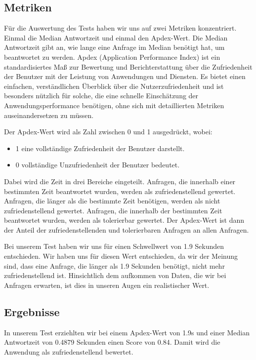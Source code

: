 \documentclass{qualitätssicherungsheft}
\begin{document}
\subsection{Metriken}
Für die Auswertung des Tests haben wir uns auf zwei Metriken konzentriert.
Einmal die Median Antwortzeit und einmal den Apdex-Wert.
Die Median Antwortzeit gibt an, wie lange eine Anfrage im Median benötigt hat, um beantwortet zu werden.
Apdex (Application Performance Index) ist ein standardisiertes Maß zur Bewertung und Berichterstattung über die Zufriedenheit der Benutzer mit der Leistung von Anwendungen und Diensten. Es bietet einen einfachen, verständlichen Überblick über die Nutzerzufriedenheit und ist besonders nützlich für solche, die eine schnelle Einschätzung der Anwendungsperformance benötigen, ohne sich mit detaillierten Metriken auseinandersetzen zu müssen.

Der Apdex-Wert wird als Zahl zwischen 0 und 1 ausgedrückt, wobei:
\begin{itemize}
    \item 1 eine vollständige Zufriedenheit der Benutzer darstellt.
    \item 0 vollständige Unzufriedenheit der Benutzer bedeutet.
\end{itemize}

Dabei wird die Zeit in drei Bereiche eingeteilt.
Anfragen, die innerhalb einer bestimmten Zeit beantwortet wurden, werden als zufriedenstellend gewertet.
Anfragen, die länger als die bestimmte Zeit benötigen, werden als nicht zufriedenstellend gewertet.
Anfragen, die innerhalb der bestimmten Zeit beantwortet wurden, werden als tolerierbar gewertet.
Der Apdex-Wert ist dann der Anteil der zufriedenstellenden und tolerierbaren Anfragen an allen Anfragen.

Bei unserem Test haben wir uns für einen Schwellwert von 1.9 Sekunden entschieden. Wir haben uns für diesen Wert entschieden, da wir der Meinung sind, dass eine Anfrage, die länger als 1.9 Sekunden benötigt, nicht mehr zufriedenstellend ist. Hinsichtlich dem aufkommen von Daten, die wir bei Anfragen erwarten, ist dies in unseren Augen ein realistischer Wert.

\subsection{Ergebnisse}
In unserem Test erziehlten wir bei einem Apdex-Wert von 1.9s und einer Median Antwortzeit von 0.4879 Sekunden einen Score von 0.84. Damit wird die Anwendung als zufriedenstellend bewertet.
\end{document}
